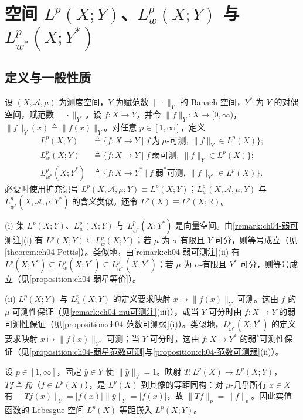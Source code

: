 \documentclass[../../main.tex]{subfiles}%
\begin{document}
\section{空间 $L^p(X;Y)$、$L^p_w(X;Y)$ 与 $L^p_{w^*}(X;Y^*)$}\label{section:ch04-Lp空间}

\subsection{定义与一般性质}\label{subsection:ch04-Lp定义}

设 $(X,\mathcal{A},\mu)$ 为测度空间，$Y$ 为赋范数 $\|\cdot\|_Y$ 的 Banach 空间，$Y^*$ 为 $Y$ 的对偶空间，赋范数 $\|\cdot\|_{Y^*}$。设 $f:X\to Y$，并令 $\|f\|_Y:X\to[0,\infty)$，$\|f\|_Y(x)\triangleq \|f(x)\|_Y$。对任意 $p\in[1,\infty]$，定义
\begin{align*}
L^p(X;Y)&\triangleq \{f:X\to Y\mid f\ \text{为}\ \mu\text{-可测},\ \|f\|_Y\in L^p(X)\};\\
L^p_w(X;Y)&\triangleq \{f:X\to Y\mid f\ \text{弱可测},\ \|f\|_Y\in L^p(X)\};\\
L^p_{w^*}(X;Y^*)&\triangleq \{f:X\to Y^*\mid f\ \text{弱}^*\text{可测},\ \|f\|_{Y^*}\in L^p(X)\}.
\end{align*}
必要时使用扩充记号 $L^p(X,\mathcal{A},\mu;Y)\equiv L^p(X;Y)$；$L^p_w(X,\mathcal{A},\mu;Y)$ 与 $L^p_{w^*}(X,\mathcal{A},\mu;Y^*)$ 的含义类似。还令 $L^p(X)\equiv L^p(X;\mathbb{R})$。

\begin{remark}\label{remark:ch04-Lp包含}
(i) 集 $L^p(X;Y)$、$L^p_w(X;Y)$ 与 $L^p_{w^*}(X;Y^*)$ 是向量空间。由\cref{remark:ch04-弱可测注}(i) 有 $L^p(X;Y)\subseteq L^p_w(X;Y)$；若 $\mu$ 为 $\sigma$-有限且 $Y$ 可分，则等号成立（见\cref{theorem:ch04-Pettis}）。类似地，由\cref{remark:ch04-弱可测注}(ii) 有 $L^p(X;Y^*)\subseteq L^p_w(X;Y^*)\subseteq L^p_{w^*}(X;Y^*)$；若 $\mu$ 为 $\sigma$-有限且 $Y^*$ 可分，则等号成立（见\cref{proposition:ch04-弱星等价}）。

(ii) $L^p(X;Y)$ 与 $L^p_w(X;Y)$ 的定义要求映射 $x\mapsto\|f(x)\|_Y$ 可测。这由 $f$ 的 $\mu$-可测性保证（见\cref{remark:ch04-mu可测注}(iii)），或当 $Y$ 可分时由 $f:X\to Y$ 的弱可测性保证（见\cref{proposition:ch04-范数可测弱}(i)）。类似地，$L^p_{w^*}(X;Y^*)$ 的定义要求映射 $x\mapsto\|f(x)\|_{Y^*}$ 可测；当 $Y$ 可分时，这由 $f:X\to Y^*$ 的弱$^*$可测性保证（见\cref{proposition:ch04-弱星范数可测}与\cref{proposition:ch04-范数可测弱}(ii)）。
\end{remark}

\begin{remark}\label{remark:ch04-标量嵌入}
设 $p\in[1,\infty]$，固定 $\bar y\in Y$ 使 $\|\bar y\|_Y=1$。映射 $T:L^p(X)\to L^p(X;Y)$，$Tf\triangleq f\bar y$（$f\in L^p(X)$），是 $L^p(X)$ 到其像的等距同构：对 $\mu$-几乎所有 $x\in X$ 有 $\|Tf(x)\|_Y=|f(x)|\|\bar y\|_Y=|f(x)|$，故 $\|Tf\|_p=\|f\|_p$。因此实值函数的 Lebesgue 空间 $L^p(X)$ 等距嵌入 $L^p(X;Y)$。
\end{remark}
\end{document}
